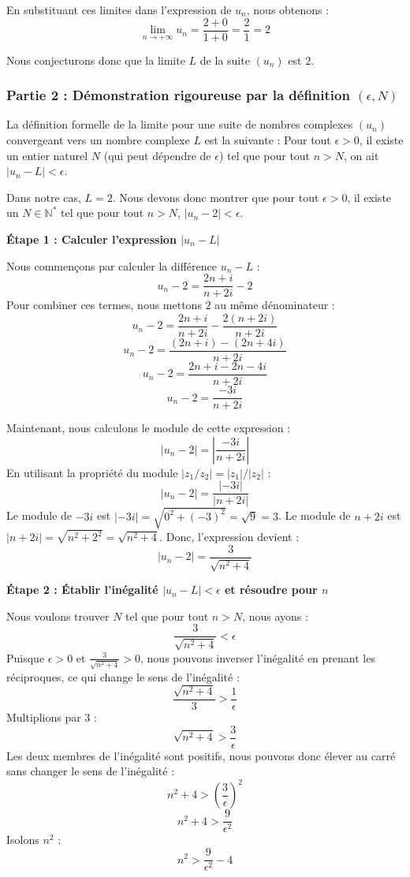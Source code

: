 \documentclass[a4paper,11pt]{report}
\begin{document}
En substituant ces limites dans l'expression de $u_n$, nous obtenons :
$$\lim_{n \to +\infty} u_n = \frac{2 + 0}{1 + 0} = \frac{2}{1} = 2$$

Nous conjecturons donc que la limite $L$ de la suite $(u_n)$ est $2$.

\subsubsection*{Partie 2 : Démonstration rigoureuse par la définition $(\epsilon, N)$}

La définition formelle de la limite pour une suite de nombres complexes $(u_n)$ convergeant vers un nombre complexe $L$ est la suivante :
Pour tout $\epsilon > 0$, il existe un entier naturel $N$ (qui peut dépendre de $\epsilon$) tel que pour tout $n > N$, on ait $|u_n - L| < \epsilon$.

Dans notre cas, $L=2$. Nous devons donc montrer que pour tout $\epsilon > 0$, il existe un $N \in \mathbb{N}^*$ tel que pour tout $n > N$, $|u_n - 2| < \epsilon$.

\textbf{Étape 1 : Calculer l'expression $|u_n - L|$}

Nous commençons par calculer la différence $u_n - L$ :
$$u_n - 2 = \frac{2n+i}{n+2i} - 2$$
Pour combiner ces termes, nous mettons $2$ au même dénominateur :
$$u_n - 2 = \frac{2n+i}{n+2i} - \frac{2(n+2i)}{n+2i}$$
$$u_n - 2 = \frac{(2n+i) - (2n+4i)}{n+2i}$$
$$u_n - 2 = \frac{2n+i - 2n-4i}{n+2i}$$
$$u_n - 2 = \frac{-3i}{n+2i}$$

Maintenant, nous calculons le module de cette expression :
$$|u_n - 2| = \left| \frac{-3i}{n+2i} \right|$$
En utilisant la propriété du module $|z_1/z_2| = |z_1|/|z_2|$ :
$$|u_n - 2| = \frac{|-3i|}{|n+2i|}$$
Le module de $-3i$ est $|-3i| = \sqrt{0^2 + (-3)^2} = \sqrt{9} = 3$.
Le module de $n+2i$ est $|n+2i| = \sqrt{n^2 + 2^2} = \sqrt{n^2+4}$.
Donc, l'expression devient :
$$|u_n - 2| = \frac{3}{\sqrt{n^2+4}}$$

\textbf{Étape 2 : Établir l'inégalité $|u_n - L| < \epsilon$ et résoudre pour $n$}

Nous voulons trouver $N$ tel que pour tout $n > N$, nous ayons :
$$\frac{3}{\sqrt{n^2+4}} < \epsilon$$
Puisque $\epsilon > 0$ et $\frac{3}{\sqrt{n^2+4}} > 0$, nous pouvons inverser l'inégalité en prenant les réciproques, ce qui change le sens de l'inégalité :
$$\frac{\sqrt{n^2+4}}{3} > \frac{1}{\epsilon}$$
Multiplions par $3$ :
$$\sqrt{n^2+4} > \frac{3}{\epsilon}$$
Les deux membres de l'inégalité sont positifs, nous pouvons donc élever au carré sans changer le sens de l'inégalité :
$$n^2+4 > \left(\frac{3}{\epsilon}\right)^2$$
$$n^2+4 > \frac{9}{\epsilon^2}$$
Isolons $n^2$ :
$$n^2 > \frac{9}{\epsilon^2} - 4$$
\end{document}
